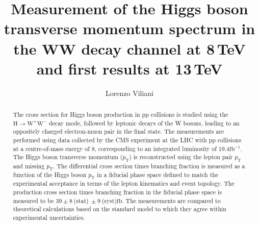 \documentclass[draft,english,booktabs,hyperref,titling]{hepthesis}
\newcommand{\fb}{\ensuremath{\mathrm{fb}}}
\newcommand{\ifb}{\ensuremath{\mathrm{fb^{-1}}}}
\newcommand{\pt}{\ensuremath{p_\mathrm{T}}\xspace}
\begin{document}
\begin{frontmatter}

\title{Measurement of the Higgs boson transverse momentum spectrum in the WW decay channel at 8\,TeV and first results at 13\,TeV}
\author{Lorenzo Viliani}


\begin{abstract}
The cross section for Higgs boson production in pp collisions is studied using the $\mathrm{H} \to \mathrm{W}^+ \mathrm{W}^-$  decay mode, followed by leptonic decays of the W bosons, leading to an oppositely charged electron-muon pair in the final state. 
The measurements are performed using data collected by the CMS experiment at the LHC with pp collisions at a centre-of-mass energy of 8\TeV, corresponding to an integrated luminosity of 19.4\ifb.
The Higgs boson transverse momentum (\pt) is reconstructed using the lepton pair \pt and missing \pt. The differential cross section times branching fraction is measured as a function of the Higgs boson \pt in a fiducial phase space defined to match the experimental acceptance in terms of the lepton kinematics and event topology. The production cross section times branching fraction in the fiducial phase space is measured to be $39 \pm 8~$(stat)$~\pm 9~$(syst)\fb. The measurements are compared to theoretical calculations based on the standard model to which they agree within experimental uncertainties.
\end{abstract}

\cleardoublepage
\pagestyle{fancy}
\fancyhead{}
\fancyfoot{}
\fancyhead[RO]{\thepage}
\fancyhead[LE]{\thepage}
\tableofcontents
\cleardoublepage

\end{frontmatter}

\begin{mainmatter}









\end{mainmatter}

\begin{backmatter}

\clearpage\thispagestyle{empty}\cleardoublepage
{}
\printbibliography
\clearpage\thispagestyle{empty}\cleardoublepage

\end{backmatter}
\end{document}

